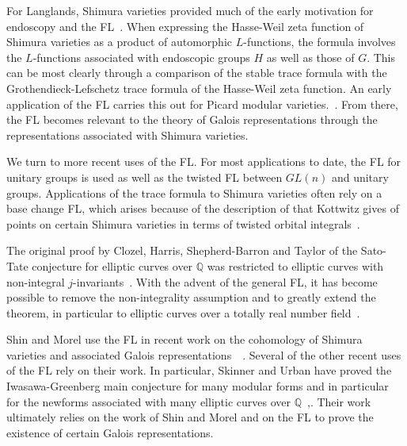 \documentclass[brochure,english,12pt]{bourbaki}
\newcommand{\ring}[1]{\mathbb{#1}}
\begin{document}
For Langlands, Shimura varieties provided much of the early motivation
for endoscopy and the FL~\cite{LZ:1979}.  When expressing the 
Hasse-Weil zeta function of Shimura varieties as a product of
automorphic $L$-functions, the formula involves the $L$-functions
associated with endoscopic groups $H$ as well as those of $G$.  This
can be most clearly through a comparison of the stable trace formula 
with the Grothendieck-Lefschetz trace formula of the Hasse-Weil zeta
function.
An early application of the FL carries this out for
Picard modular
varieties.~\cite{LPicard:1992}.  From there, the FL becomes relevant to the theory of Galois representations
through the representations associated with Shimura varieties.

We turn to more recent uses of the FL.  
For most applications to
date, the FL for unitary groups is used as well as the twisted FL
between $GL(n)$ and unitary groups.  Applications of the trace formula
to Shimura varieties often rely on a base change FL, which  arises
because of the description of that Kottwitz gives of points on certain
Shimura varieties in terms of twisted orbital
integrals~\cite{Kott:1990}.


The original proof by Clozel, Harris, Shepherd-Barron and Taylor
of the Sato-Tate conjecture for elliptic curves over
$\ring{Q}$ was restricted to elliptic curves with non-integral
$j$-invariants~\cite{Car:Bourbaki}.
With the advent of the general FL, it has become possible to remove
the non-integrality assumption and to greatly extend the theorem, in particular 
to elliptic curves over a totally real number field~\cite{BGHT:2010}.




Shin and Morel use the FL in recent work on the cohomology of
Shimura varieties and associated Galois
representations~\cite{Shin:2010}~\cite{Morel:2010}.  Several of the
other recent uses of the FL rely on their work.  In particular,
Skinner and Urban have proved the Iwasawa-Greenberg main conjecture
for many modular forms and in particular for the newforms associated
with many elliptic curves over
$\ring{Q}$~\cite{Skinner-Urban:2010},\cite{Skinner:2010}.  Their work
ultimately relies on the work of Shin and Morel and on the FL to prove
the existence of certain Galois representations. 
\end{document}
